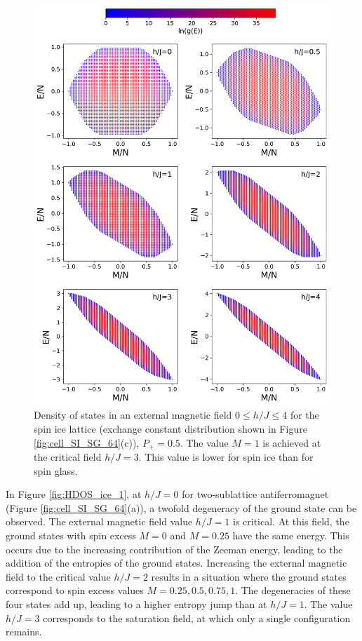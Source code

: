 \documentclass[preprint,12pt]{elsarticle}
\begin{document}
	
	\begin{figure}[H]
		\centering
		\includegraphics[width=1\linewidth]{pictures/HDOS_SI_64_J0.png}
		\caption{Density of states in an external magnetic field $0\leq h/J \leq 4$ for the spin ice lattice (exchange constant distribution shown in Figure \ref{fig:cell_SI_SG_64}(c)), $P_+ = 0.5$. The value $M=1$ is achieved at the critical field $h/J=3$. This value is lower for spin ice than for spin glass.}
		\label{fig:HDOS_ice}
	\end{figure}
	
	In Figure \ref{fig:HDOS_ice_1}, at $h/J = 0$ for two-sublattice antiferromagnet (Figure \ref{fig:cell_SI_SG_64}(a)), a twofold degeneracy of the ground state can be observed. The external magnetic field value $h/J = 1$ is critical. At this field, the ground states with spin excess $M = 0$ and $M = 0.25$ have the same energy. This occurs due to the increasing contribution of the Zeeman energy, leading to the addition of the entropies of the ground states.  
	Increasing the external magnetic field to the critical value $h/J = 2$ results in a situation where the ground states correspond to spin excess values $M = 0.25, 0.5, 0.75, 1$. The degeneracies of these four states add up, leading to a higher entropy jump than at $h/J = 1$.  
	The value $h/J = 3$ corresponds to the saturation field, at which only a single configuration remains.
	
\end{document}
